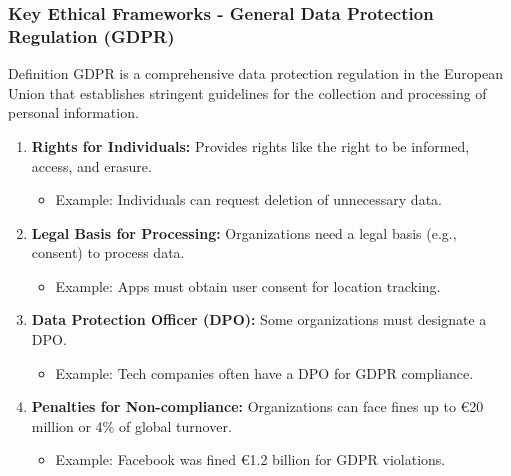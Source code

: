 \documentclass[aspectratio=169]{beamer}
\begin{document}
\begin{frame}[fragile]
    \frametitle{Key Ethical Frameworks - General Data Protection Regulation (GDPR)}
    \begin{block}{Definition}
        GDPR is a comprehensive data protection regulation in the European Union that establishes stringent guidelines for the collection and processing of personal information.
    \end{block}

    \begin{enumerate}
        \item \textbf{Rights for Individuals:} Provides rights like the right to be informed, access, and erasure.
            \begin{itemize}
                \item Example: Individuals can request deletion of unnecessary data.
            \end{itemize}
        \item \textbf{Legal Basis for Processing:} Organizations need a legal basis (e.g., consent) to process data.
            \begin{itemize}
                \item Example: Apps must obtain user consent for location tracking.
            \end{itemize}
        \item \textbf{Data Protection Officer (DPO):} Some organizations must designate a DPO.
            \begin{itemize}
                \item Example: Tech companies often have a DPO for GDPR compliance.
            \end{itemize}
        \item \textbf{Penalties for Non-compliance:} Organizations can face fines up to €20 million or 4\% of global turnover.
            \begin{itemize}
                \item Example: Facebook was fined €1.2 billion for GDPR violations.
            \end{itemize}
    \end{enumerate}
\end{frame}
\end{document}
